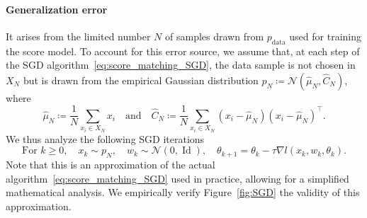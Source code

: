 \documentclass[11pt]{article}
\newcommand{\eqdef}{\coloneqq}
\newcommand{\id}{\operatorname{Id}}
\begin{document}
\paragraph{Generalization error}
It arises from the limited number $N$ of samples drawn from \( p_{\mathrm{data}} \) used for training the score model.
To account for this error source, we assume that, at each step of the SGD algorithm~\eqref{eq:score_matching_SGD}, the data sample is not chosen in $X_N$ but is drawn from the empirical Gaussian distribution $p_N \eqdef \mathcal{N}(\hat{\mu}_N, \hat{C}_N)$, where
\begin{equation} \label{eq:pN}
\hat{\mu}_N \eqdef \frac{1}{N}\sum_{x_i \in X_N} x_i \quad\text{and}\quad \hat{C}_N \eqdef \frac{1}{N}\sum_{x_i \in X_N} (x_i - \hat{\mu}_N)(x_i - \hat{\mu}_N)^\top.
\end{equation}
We thus analyze the following SGD iterations
\begin{equation} \label{eq:score_matching_SGD_emp}
    \text{For $k \geq 0$}, \quad  x_k \sim p_N, \quad w_k \sim \mathcal{N}(0, \id), \quad \theta_{k+1} = \theta_k - \tau \nabla l(x_k, w_k, \theta_k). 
\end{equation}
Note that this is an approximation of the actual algorithm~\eqref{eq:score_matching_SGD} used in practice, allowing for a simplified mathematical analysis. We empirically verify Figure~\ref{fig:SGD} the validity of this approximation.

\end{document}
